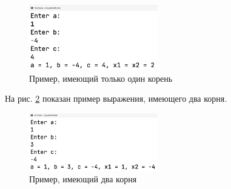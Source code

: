 \documentclass[a4paper,14pt]{extarticle}
\numberwithin{figure}{section}
\begin{document}
\begin{figure}[H]
    \centering
    \includegraphics[width=0.5\textwidth]{images/task-5-2.png}
    \caption{Пример, имеющий только один корень}
    \label{fig:task-5-2}
\end{figure}

На рис. \ref{fig:task-5-3} показан пример выражения, имеющего два корня.

\begin{figure}[H]
    \centering
    \includegraphics[width=0.5\textwidth]{images/task-5-3.png}
    \caption{Пример, имеющий два корня}
    \label{fig:task-5-3}
\end{figure}
\end{document}
